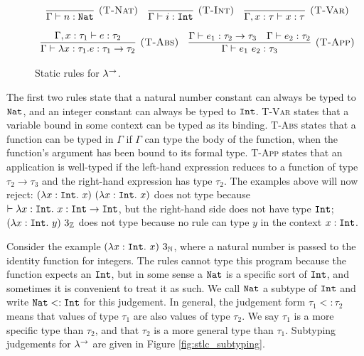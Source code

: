 \begin{figure}[h]


\[
\begin{array}{c}

\infer[\textsc{(T-Nat)}]
	{\Gamma \vdash n: \Nat}
	{}
	~~~
\infer[\textsc{(T-Int)}]
	{\Gamma \vdash i: \Int}
	{}
~~~
\infer[\textsc{(T-Var)}]
	{\Gamma, x: \tau \vdash x: \tau}
	{} \\[2ex]
	
\infer[\textsc{(T-Abs)}]
	{\Gamma \vdash \lambda x: \tau_1.e : \tau_1 \rightarrow \tau_2}
	{\Gamma, x: \tau_1 \vdash e: \tau_2} 
	~~~
	
\infer[\textsc{(T-App)}]
	{\Gamma \vdash e_1~e_2: \tau_3}
	{\Gamma \vdash e_1: \tau_2 \rightarrow \tau_3 & \Gamma \vdash e_2: \tau_2}

\end{array}
\]


\vspace{-12pt}
\caption{Static rules for $\lambda^{\rightarrow}$.}
\label{fig:stlc_static_rules}
\end{figure}

The first two rules state that a natural number constant can always be typed to $\mathtt{Nat}$, and an integer constant can always be typed to $\mathtt{Int}$. \textsc{T-Var} states that a variable bound in some context can be typed as its binding. \textsc{T-Abs} states that a function can be typed in $\Gamma$ if $\Gamma$ can type the body of the function, when the function's argument has been bound to its formal type. \textsc{T-App} states that an application is well-typed if the left-hand expression reduces to a function of type $\tau_2 \rightarrow \tau_3$ and the right-hand expression has type $\tau_2$. The examples above will now reject: $(\lambda x: \mathtt{Int}.~x)~(\lambda x:\mathtt{Int}.~x)$ does not type because $\vdash \lambda x: \mathtt{Int}.~x : \mathtt{Int} \rightarrow \mathtt{Int}$, but the right-hand side does not have type $\mathtt{Int}$; $(\lambda x: \mathtt{Int}.~y)~3_{\mathbb{Z}}$ does not type because no rule can type $y$ in the context $x: \mathtt{Int}$.

Consider the example $(\lambda x: \mathtt{Int}.~x)~3_{\mathbb{N}}$, where a natural number is passed to the identity function for integers. The rules cannot type this program because the function expects an $\mathtt{Int}$, but in some sense a $\mathtt{Nat}$ is a specific sort of $\mathtt{Int}$, and sometimes it is convenient to treat it as such. We call $\mathtt{Nat}$ a subtype of $\mathtt{Int}$ and write $\mathtt{Nat} <: \mathtt{Int}$ for this judgement. In general, the judgement form $\tau_1 <: \tau_2$ means that values of type $\tau_1$ are also values of type $\tau_2$. We say $\tau_1$ is a more specific type than $\tau_2$, and that $\tau_2$ is a more general type than $\tau_1$. Subtyping judgements for $\lambda^{\rightarrow}$ are given in Figure \ref{fig:stlc_subtyping}. 

